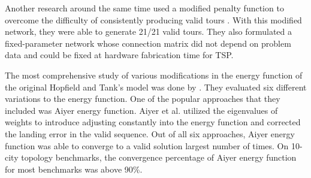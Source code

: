 \documentclass{article}
\begin{document}
Another research around the same time \cite{den1988traveling} used a modified penalty function to overcome the difficulty of consistently producing valid tours \cite{yao1988alternative}. With this modified network, they were able to generate 21/21 valid tours. They also formulated a fixed-parameter network whose connection matrix did not depend on problem data and could be fixed at hardware fabrication time for TSP.

The most comprehensive study of various modifications in the energy function of the original Hopfield and Tank's model was done by \cite{lin1994impact}. They evaluated six different variations to the energy function. One of the popular approaches that they included was Aiyer energy function\cite{aiyer1990theoretical}. Aiyer et al. utilized the eigenvalues of weights to introduce adjusting constantly into the energy function and corrected the landing error in the valid sequence. Out of all six approaches, Aiyer energy function was able to converge to a valid solution largest number of times. On 10-city topology benchmarks, the convergence percentage of Aiyer energy function for most benchmarks was above 90\%.
\end{document}

